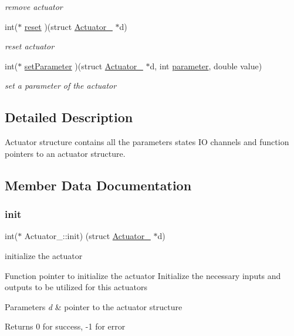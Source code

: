 \begin{DoxyCompactItemize}
\begin{DoxyCompactList}\small\item\em remove actuator \end{DoxyCompactList}\item 
int($\ast$ \hyperlink{struct_actuator___a4a10f32cb9795a3cc9f18be797a2fd8e}{reset} )(struct \hyperlink{struct_actuator__}{Actuator\+\_\+} $\ast$d)
\begin{DoxyCompactList}\small\item\em reset actuator \end{DoxyCompactList}\item 
int($\ast$ \hyperlink{struct_actuator___ad94f7d72b09f1a8ccc779a082a685026}{set\+Parameter} )(struct \hyperlink{struct_actuator__}{Actuator\+\_\+} $\ast$d, int \hyperlink{struct_actuator___a0458086d5d3f6c5282c6c4e033054c08}{parameter}, double value)
\begin{DoxyCompactList}\small\item\em set a parameter of the actuator \end{DoxyCompactList}\end{DoxyCompactItemize}


\subsection{Detailed Description}
Actuator structure contains all the parameters states IO channels and function pointers to an actuator structure. 

\subsection{Member Data Documentation}
\mbox{\label{struct_actuator___a9dd4cdb3284c8509f72af4f4d2b316b0}} 
\subsubsection{\texorpdfstring{init}{init}}
{\footnotesize\ttfamily int($\ast$ Actuator\+\_\+\+::init) (struct \hyperlink{struct_actuator__}{Actuator\+\_\+} $\ast$d)}



initialize the actuator 

Function pointer to initialize the actuator Initialize the necessary inputs and outputs to be utilized for this actuators 
\begin{DoxyParams}{Parameters}
{\em d} & pointer to the actuator structure \\
\hline
\end{DoxyParams}
\begin{DoxyReturn}{Returns}
0 for success, -\/1 for error 
\end{DoxyReturn}
\mbox{\label{struct_actuator___ad5d2e19e23d4d49b2b5df2d2e0a0755d}} 
